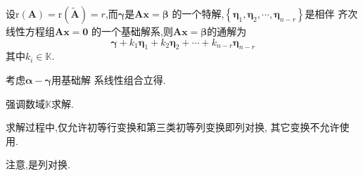 \begin{formal}
\begin{theorem}[结构定理]\label{thm:结构定理}
    设$\mathrm{r}\left(\bm{A}\right)
    =\mathrm{r}\left(\widetilde{\bm{A}
    }\right) = r$,而$\bm{\gamma}$是$\bm{Ax}=\bm{\beta}$
    的一个特解,$\left\{\bm{\eta}_1,\bm{\eta}_2,\cdots
    ,\bm{\eta}_{n - r}\right\}$是相伴
    齐次线性方程组$\bm{Ax}=\bm{0}$
    的一个基础解系,则$
    \bm{Ax}=\bm{\beta}$的通解为
    \[
        \bm{\gamma}+
        k_1\bm{\eta}_1+k_2\bm{\eta}_2+\cdots
        +k_{n - r}\bm{\eta}_{n - r}
    \]
    其中$k_i \in \mathbb{K}$.
\end{theorem}
\begin{Proof}
考虑$\bm{\alpha}-\bm{\gamma}$用基础解
系线性组合立得.
\end{Proof}
\end{formal}
\begin{red}
\begin{remark}
    强调数域$\mathbb{K}$求解.
\end{remark}
\end{red}
\begin{red}
\begin{remark}
    求解过程中,仅允许初等行变换和第三类初等列变换即列对换,
    其它变换不允许使用.

    注意,是列对换.
\end{remark}
\end{red}
